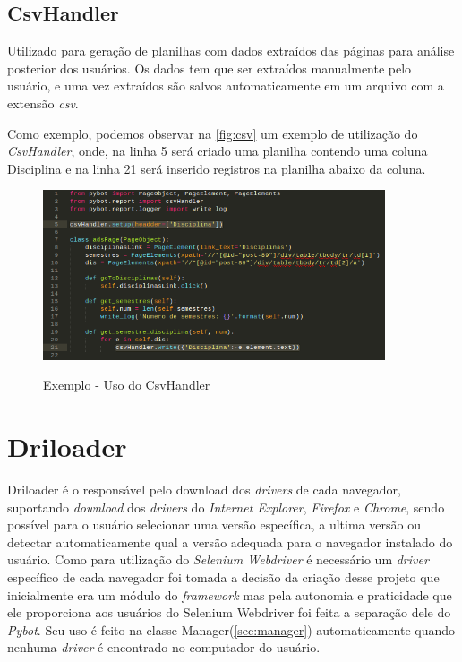         \subsection{CsvHandler}
        Utilizado para geração de planilhas com dados extraídos das páginas para análise posterior dos usuários. Os dados tem que ser extraídos manualmente pelo
        usuário, e uma vez extraídos são salvos automaticamente em um arquivo com a extensão \textit{csv}.

        Como exemplo, podemos observar na \autoref{fig:csv} um exemplo de utilização do \textit{CsvHandler}, onde, na linha 5 será criado uma planilha contendo uma
        coluna Disciplina e na linha 21 será inserido registros na planilha abaixo da coluna.

        \begin{figure}[H]
            \vspace*{0,3cm}
            \centering
            \caption{Exemplo - Uso do CsvHandler}
            \includegraphics[width=0.9\textwidth]{./04-figuras/csv}
            \label{fig:csv}
        \end{figure}


    \section{Driloader}
    \label{driloader}
        Driloader é o responsável pelo download dos \textit{drivers} de cada navegador, suportando \textit{download} dos \textit{drivers} do \textit{Internet Explorer},
        \textit{Firefox} e \textit{Chrome}, sendo possível para o usuário selecionar uma versão específica, a ultima versão ou detectar automaticamente qual a versão adequada para o navegador
        instalado do usuário. Como para utilização do \textit{Selenium Webdriver} é necessário um \textit{driver} específico de cada navegador foi tomada a decisão da criação
        desse projeto que inicialmente era um módulo do \textit{framework} mas pela autonomia e praticidade que ele proporciona aos usuários do Selenium Webdriver foi feita a
        separação dele do \textit{Pybot}. Seu uso é feito na classe Manager(\autoref{sec:manager}) automaticamente quando nenhuma \textit{driver} é encontrado no computador do usuário.



